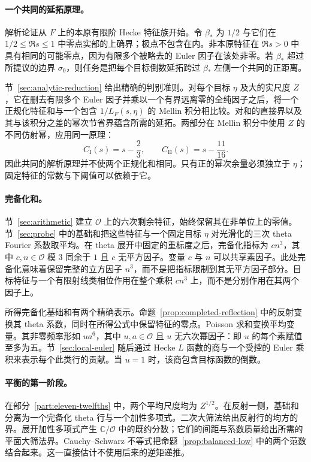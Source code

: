 \paragraph{一个共同的延拓原理。}
解析论证从 $F$ 上的本原有限阶 Hecke 特征族开始。令 $\beta_*$ 为 $1/2$ 与它们在 $1/2\le\Re s\le1$ 中零点实部的上确界；极点不包含在内。非本原特征在 $\Re s>0$ 中具有相同的可能零点，因为有限多个被略去的 Euler 因子在该处非零。若 $\beta_*$ 超过所提议的边界 $\sigma_0$，则任务是把每个目标倒数延拓跨过 $\beta_*$ 左侧一个共同的正距离。

节~\ref{sec:analytic-reduction} 给出精确的判别准则。对每个目标 $\eta$ 及大的实尺度 $Z$，它在删去有限多个 Euler 因子并乘以一个有界远离零的全纯因子之后，将一个正规化特征和与一个包含 $1/L_F(s,\eta)$ 的 Mellin 积分相比较。对和的直接界以及其与该积分之差的幂次节省界蕴含所需的延拓。两部分在 Mellin 积分中使用 $Z$ 的不同仿射幂，应用同一原理：
\[
 C_{\mathrm I}(s)=s-\frac23,\qquad
 C_{\mathrm{II}}(s)=s-\frac{11}{16}.
\]
因此共同的解析原理并不使两个正规化和相同。只有正的幂次余量必须独立于 $\eta$；固定特征的常数与下阈值可以依赖于它。

\paragraph{完备化和。}
节~\ref{sec:arithmetic} 建立 $\mathcal O$ 上的六次剩余特征，始终保留其在非单位上的零值。节~\ref{sec:probe} 中的基础和把这些特征与一个固定目标 $\eta$ 对光滑化的三次 theta Fourier 系数取平均。在 theta 展开中固定的重标度之后，完备化指标为 $cn^3$，其中 $c,n\in\mathcal O$ 模 $3$ 同余于 $1$ 且 $c$ 无平方因子。变量 $c$ 与 $n$ 可以共享素因子。此处完备化意味着保留完整的立方因子 $n^3$，而不是把指标限制到其无平方因子部分。目标特征与一个有限射线类相位作用在整个乘积 $cn^3$ 上，而不是分别作用在其两个因子上。

所得完备化基础和有两个精确表示。命题~\ref{prop:completed-reflection} 中的反射变换其 theta 系数，同时在所得公式中保留特征的零点。Poisson 求和变换平均变量。其非零频率形如 $ua^6$，其中 $u,a\in\mathcal O$ 且 $u$ 无六次幂因子：即 $u$ 的每个素赋值至多为五。节~\ref{sec:local-euler} 随后通过 Hecke $L$ 函数的商与一个受控的 Euler 乘积来表示每个此类行的贡献。当 $u=1$ 时，该商包含目标函数的倒数。

\paragraph{平衡的第一阶段。}
在部分~\ref{part:eleven-twelfths} 中，两个平均尺度均为 $Z^{1/2}$。在反射一侧，基础和分离为一个完备化 theta 行与一个加性多项式。二次大筛法给出反射行的均方的界。展开加性多项式产生 $\mathbb C/\mathcal O$ 中的既约分数；它们的间距与系数质量给出所需的平面大筛法界。Cauchy--Schwarz 不等式把命题~\ref{prop:balanced-low} 中的两个范数结合起来。这一直接估计不使用后来的逆矩递推。

